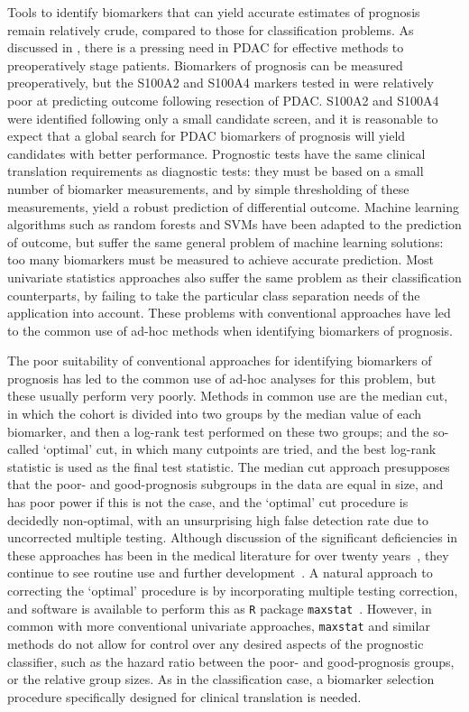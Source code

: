 \documentclass[dissertation.tex]{subfiles}
\begin{document}
Tools to identify biomarkers that can yield accurate estimates of prognosis remain relatively crude, compared to those for classification problems.  As discussed in , there is a pressing need in \gls{PDAC} for effective methods to preoperatively stage patients.  Biomarkers of prognosis can be measured preoperatively, but the S100A2 and S100A4 markers tested in  were relatively poor at predicting outcome following resection of \gls{PDAC}.  S100A2 and S100A4 were identified following only a small candidate screen, and it is reasonable to expect that a global search for \gls{PDAC} biomarkers of prognosis will yield candidates with better performance.  Prognostic tests have the same clinical translation requirements as diagnostic tests: they must be based on a small number of biomarker measurements, and by simple thresholding of these measurements, yield a robust prediction of differential outcome.  Machine learning algorithms such as random forests and \glspl{SVM} have been adapted to the prediction of outcome, but suffer the same general problem of machine learning solutions: too many biomarkers must be measured to achieve accurate prediction.  Most univariate statistics approaches also suffer the same problem as their classification counterparts, by failing to take the particular class separation needs of the application into account.  These problems with conventional approaches have led to the common use of ad-hoc methods when identifying biomarkers of prognosis.

The poor suitability of conventional approaches for identifying biomarkers of prognosis has led to the common use of ad-hoc analyses for this problem, but these usually perform very poorly.  Methods in common use are the median cut, in which the cohort is divided into two groups by the median value of each biomarker, and then a log-rank test performed on these two groups; and the so-called `optimal' cut, in which many cutpoints are tried, and the best log-rank statistic is used as the final test statistic.  The median cut approach presupposes that the poor- and good-prognosis subgroups in the data are equal in size, and has poor power if this is not the case, and the `optimal' cut procedure is decidedly non-optimal, with an unsurprising high false detection rate due to uncorrected multiple testing.  Although discussion of the significant deficiencies in these approaches has been in the medical literature for over twenty years~\cite{Altman1994}, they continue to see routine use and further development~\cite{Budczies2012,Camp2004,Chorlton2014,Yau2010}.  A natural approach to correcting the `optimal' procedure is by incorporating multiple testing correction, and software is available to perform this as \texttt{R} package \texttt{maxstat}~\cite{Chorlton2014,Hothorn2003}.  However, in common with more conventional univariate approaches, \texttt{maxstat} and similar methods do not allow for control over any desired aspects of the prognostic classifier, such as the hazard ratio between the poor- and good-prognosis groups, or the relative group sizes.  As in the classification case, a biomarker selection procedure specifically designed for clinical translation is needed.
\end{document}
